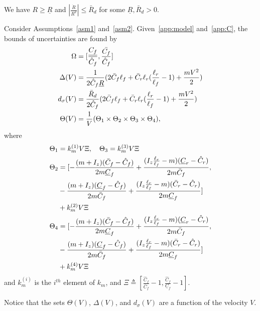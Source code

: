 \documentclass[letterpaper, 10 pt, conference]{ieeeconf}
\begin{document}
\begin{assumption}
We have
$R\geq \underline{R}$ and $|\frac{\dot{R}}{R^2}| \leq \bar{R}_d$ for some $\underline{R},\bar{R}_d > 0$.
\label{asm2}
\end{assumption}



\begin{lemma}
Consider Assumptions~\ref{asm1} and~\ref{asm2}.
Given~\eqref{app:model} and~\eqref{app:C}, the bounds of uncertainties are found by
\begin{align}
    \Omega &= [\frac{\underline{C_f}}{\hat{C}_f},\frac{\bar{C_f}}{\hat{C}_f}]\nonumber\\
    \Delta(V) &= \frac{1}{2\hat{C}_f \underline{R}}(2\bar{C}_f\ell_f+\bar{C}_r\ell_r(\frac{\ell_r}{\ell_f}-1)+\frac{mV^2}{2})\nonumber\\
    d_{\sigma}(V) &= \frac{\bar{R}_d}{2\hat{C}_f }(2\bar{C}_f\ell_f+\bar{C}_r\ell_r(\frac{\ell_r}{\ell_f}-1)+\frac{mV^2}{2})\nonumber\\
    \Theta(V) &= \frac{1}{V}(\Theta_1 \times \Theta_2 \times\Theta_3\times\Theta_4),
    \label{eq:bounds}
\end{align}
where
\begin{align}
    \Theta_1&= k_{m}^{(1)} V \Xi, \quad \Theta_3=k_{m}^{(3)} V \Xi\nonumber\\
    \Theta_2 &= [-\frac{(m+I_z)(\bar{C}_f-\hat{C}_f)}{2 m  \underline{C}_f}+\frac{(I_z\frac{\ell_r}{\ell_f}-m)(\underline{C}_r-\hat{C}_r)}{2 m  \bar{C}_f},\nonumber\\
    &-\frac{(m+I_z)(\underline{C}_f-\hat{C}_f)}{2m  \bar{C}_f}+\frac{(I_z\frac{\ell_r}{\ell_f}-m)(\bar{C}_r-\hat{C}_r)}{ 2 m  \underline{C}_f}]\nonumber\\
    &+k_{m}^{(2)} V \Xi\nonumber\\
    \Theta_4 & = [-\frac{(m+I_z)(\bar{C}_f-\hat{C}_f)}{2 m  \underline{C}_f}+\frac{(I_z\frac{\ell_r}{\ell_f}-m)(\underline{C}_r-\hat{C}_r)}{2 m  \bar{C}_f},\nonumber\\
    &-\frac{(m+I_z)(\underline{C}_f-\hat{C}_f)}{2 m  \bar{C}_f}+\frac{(I_z\frac{\ell_r}{\ell_f}-m)(\bar{C}_r-\hat{C}_r)}{2 m  \underline{C}_f}]\nonumber\\
    &+k_{m}^{(4)} V \Xi
    \label{app:theta}
\end{align}
and $k_{m}^{(i)}$ is the $i^{th}$ element of $k_m$, and $\Xi \triangleq [\frac{\hat{C}_f}{\bar{C}_f}-1, \frac{\hat{C}_f}{\underline{C}_f}-1]$.
\label{lem1}
\end{lemma}

Notice that the sets $\Theta(V)$, $\Delta(V)$, and $d_{\sigma}(V)$ are a function of the velocity $V$.
\end{document}
